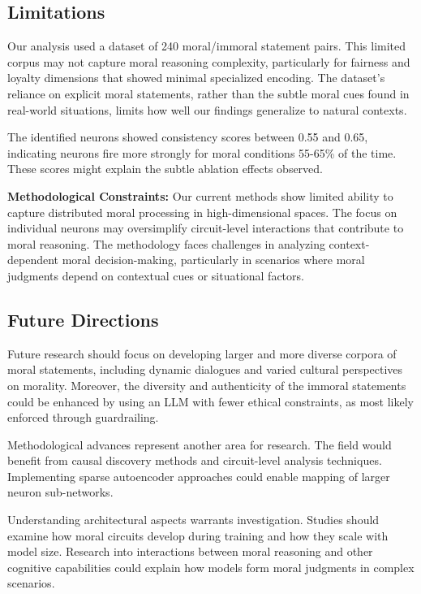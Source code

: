 \documentclass[runninghheads]{llncs}
\begin{document}
\subsection{Limitations}

Our analysis used a dataset of 240 moral/immoral statement pairs. This limited corpus may not capture moral reasoning complexity, particularly for fairness and loyalty dimensions that showed minimal specialized encoding. 
The dataset's reliance on explicit moral statements, rather than the subtle moral cues found in real-world situations, limits how well our findings generalize to natural contexts.

The identified neurons showed consistency scores between 0.55 and 0.65, indicating neurons fire more strongly for moral conditions 55-65\% of the time. These scores might explain the subtle ablation effects observed.

\textbf{Methodological Constraints:} Our current methods show limited ability to capture distributed moral processing in high-dimensional spaces. The focus on individual neurons may oversimplify circuit-level interactions that contribute to moral reasoning. The methodology faces challenges in analyzing context-dependent moral decision-making, particularly in scenarios where moral judgments depend on contextual cues or situational factors.

\subsection{Future Directions}

Future research should focus on developing larger and more diverse corpora of moral statements, including dynamic dialogues and varied cultural perspectives on morality. 
Moreover, the diversity and authenticity of the immoral statements could be enhanced by using an LLM with fewer ethical constraints, as most likely enforced through guardrailing.


Methodological advances represent another area for research. The field would benefit from causal discovery methods and circuit-level analysis techniques. Implementing sparse autoencoder approaches could enable mapping of larger neuron sub-networks.

Understanding architectural aspects warrants investigation. Studies should examine how moral circuits develop during training and how they scale with model size. Research into interactions between moral reasoning and other cognitive capabilities could explain how models form moral judgments in complex scenarios.
\end{document}
